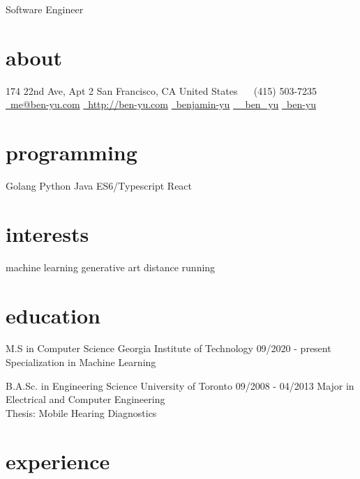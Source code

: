 \documentclass[11pt, print]{friggeri-cv}
\begin{document}
\pdfpagewidth=8.5in
\pdfpageheight=11in
{Software Engineer}

\begin{aside}
  \section{about}
    174 22nd Ave, Apt 2
    San Francisco, CA
    United States
    ~
    \symbolfont\faPhone\bodyfont\ (415) 503-7235
    \href{mailto:me@ben-yu.com}{\symbolfont\faEnvelope\bodyfont\ me@ben-yu.com}
    \href{http://ben-yu.com}{\symbolfont\faGlobe \bodyfont\ http://ben-yu.com}
    \href{http://www.linkedin.com/pub/benjamin-yu/20/9b0/153}{\symbolfont{\faLinkedin} \bodyfont\ benjamin-yu}
    \href{http://twitter.com/_ben_yu}{\symbolfont\faTwitter \bodyfont\ \_ben\_yu}
    \href{https://github.com/ben-yu}{\symbolfont{\faGithub} \bodyfont\ ben-yu}
  \section{programming}
    Golang
    Python
    Java
    ES6/Typescript
    React
  \section{interests}
    machine learning
    generative art
    distance running
\end{aside}

\section{education}

\begin{entrylist}
  \entry
    {M.S in Computer Science}
    {Georgia Institute of Technology}
    {09/2020 - present}
    {Specialization in Machine Learning}

  \entry
    {B.A.Sc. in Engineering Science}
    {University of Toronto}
    {09/2008 - 04/2013}
    {Major in Electrical and Computer Engineering \\
     Thesis: Mobile Hearing Diagnostics}

\end{entrylist}

\section{experience}
\end{document}
